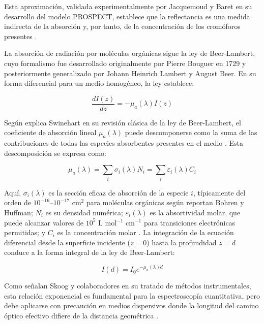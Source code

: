 \documentclass[12pt, a4paper]{article}
\begin{document}
	Esta aproximación, validada experimentalmente por Jacquemoud y Baret en su desarrollo del modelo PROSPECT, establece que la reflectancia es una medida indirecta de la absorción y, por tanto, de la concentración de los cromóforos presentes \parencite{jacquemoud1990}.
	
	La absorción de radiación por moléculas orgánicas sigue la ley de Beer-Lambert, cuyo formalismo fue desarrollado originalmente por Pierre Bouguer en 1729 y posteriormente generalizado por Johann Heinrich Lambert y August Beer. En su forma diferencial para un medio homogéneo, la ley establece:
	
	\begin{equation}
		\frac{dI(z)}{dz} = -\mu_a(\lambda) I(z)
		\label{eq:beer_lambert_diferencial}
	\end{equation}
	
	Según explica Swinehart en su revisión clásica de la ley de Beer-Lambert, el coeficiente de absorción lineal $\mu_a(\lambda)$ puede descomponerse como la suma de las contribuciones de todas las especies absorbentes presentes en el medio \parencite{Swinehart1962}. Esta descomposición se expresa como:
	
	\begin{equation}
		\mu_a(\lambda) = \sum_i \sigma_i(\lambda) N_i = \sum_i \varepsilon_i(\lambda) C_i
		\label{eq:coeficiente_absorcion}
	\end{equation}
	
	Aquí, $\sigma_i(\lambda)$ es la sección eficaz de absorción de la especie $i$, típicamente del orden de $10^{-16}$--$10^{-17}$ cm$^2$ para moléculas orgánicas según reportan Bohren y Huffman; $N_i$ es su densidad numérica; $\varepsilon_i(\lambda)$ es la absortividad molar, que puede alcanzar valores de $10^5$ L mol$^{-1}$ cm$^{-1}$ para transiciones electrónicas permitidas; y $C_i$ es la concentración molar \parencite{bohren1983, lichtenthaler2001}. La integración de la ecuación diferencial desde la superficie incidente ($z=0$) hasta la profundidad $z=d$ conduce a la forma integral de la ley de Beer-Lambert:
	
	\begin{equation}
		I(d) = I_0 e^{-\mu_a(\lambda) d}
		\label{eq:beer_lambert_integral}
	\end{equation}
	
	Como señalan Skoog y colaboradores en su tratado de métodos instrumentales, esta relación exponencial es fundamental para la espectroscopía cuantitativa, pero debe aplicarse con precaución en medios dispersivos donde la longitud del camino óptico efectivo difiere de la distancia geométrica \parencite{Skoog2017}.
	
\end{document}

